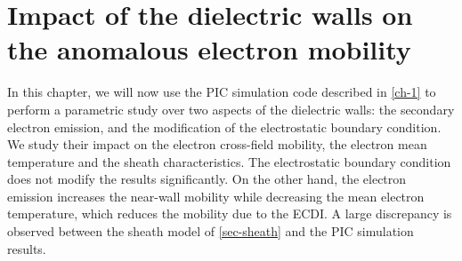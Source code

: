 



\chapter{Impact of the dielectric walls on the anomalous electron mobility }
\label{ch-2}

\begin{Chabstract}
In this chapter, we will now use the PIC simulation code described in \cref{ch-1} to perform a parametric study over two aspects of the dielectric walls\string: the secondary electron emission, and the modification of the electrostatic boundary condition.
We study their impact on the electron cross-field mobility, the electron mean temperature and the sheath characteristics.
The electrostatic boundary condition does not modify the results significantly.
On the other hand, the electron emission increases the near-wall mobility while decreasing the mean electron temperature, which reduces the mobility due to the \ac{ECDI}.
A large discrepancy is observed between the sheath model of \cref{sec-sheath} and the PIC simulation results.
\end{Chabstract}



\minitoc


% 
% 
% 
% 
% 
% 
% 










